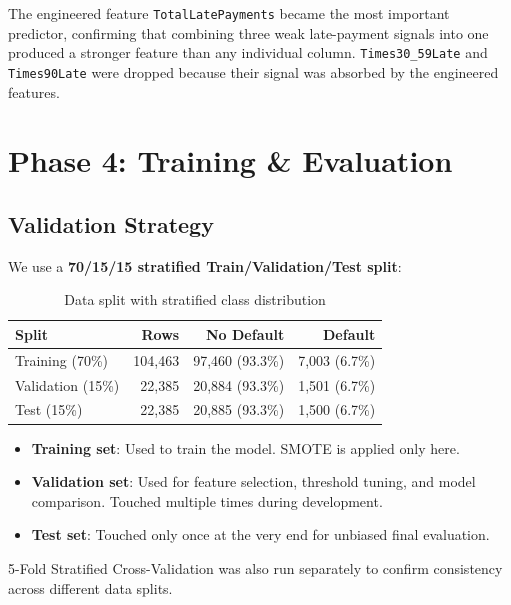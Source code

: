 \documentclass[12pt, a4paper]{article}
\begin{document}
The engineered feature \texttt{TotalLatePayments} became the most important predictor, confirming that combining three weak late-payment signals into one produced a stronger feature than any individual column. \texttt{Times30\_59Late} and \texttt{Times90Late} were dropped because their signal was absorbed by the engineered features.

\newpage


\section{Phase 4: Training \& Evaluation}

\subsection{Validation Strategy}

We use a \textbf{70/15/15 stratified Train/Validation/Test split}:

\begin{table}[H]
\centering
\begin{tabular}{lrrr}
\toprule
\textbf{Split} & \textbf{Rows} & \textbf{No Default} & \textbf{Default} \\
\midrule
Training (70\%) & 104,463 & 97,460 (93.3\%) & 7,003 (6.7\%) \\
Validation (15\%) & 22,385 & 20,884 (93.3\%) & 1,501 (6.7\%) \\
Test (15\%) & 22,385 & 20,885 (93.3\%) & 1,500 (6.7\%) \\
\bottomrule
\end{tabular}
\caption{Data split with stratified class distribution}
\end{table}

\begin{itemize}[noitemsep]
    \item \textbf{Training set}: Used to train the model. SMOTE is applied only here.
    \item \textbf{Validation set}: Used for feature selection, threshold tuning, and model comparison. Touched multiple times during development.
    \item \textbf{Test set}: Touched only once at the very end for unbiased final evaluation.
\end{itemize}

5-Fold Stratified Cross-Validation was also run separately to confirm consistency across different data splits.
\end{document}
